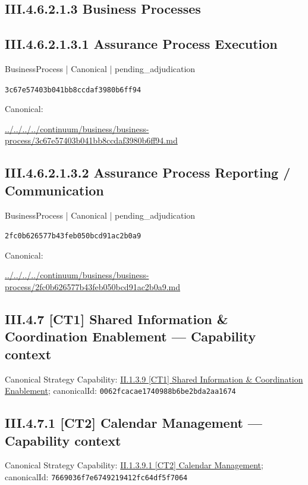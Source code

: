 \documentclass[10pt,a4paper]{article}
\begin{document}
\subsection*{III.4.6.2.1.3 Business Processes}
\subsection*{III.4.6.2.1.3.1 Assurance Process Execution}
\label{element-3c67e57403b041bb8ccdaf3980b6ff94}
{\small BusinessProcess | Canonical | pending\_adjudication}\par
\texttt{3c67e57403b041bb8ccdaf3980b6ff94}\par
Canonical: \par
{\footnotesize\url{../../../../continuum/business/business-process/3c67e57403b041bb8ccdaf3980b6ff94.md}}\par
\subsection*{III.4.6.2.1.3.2 Assurance Process Reporting / Communication}
\label{element-2fc0b626577b43feb050bcd91ac2b0a9}
{\small BusinessProcess | Canonical | pending\_adjudication}\par
\texttt{2fc0b626577b43feb050bcd91ac2b0a9}\par
Canonical: \par
{\footnotesize\url{../../../../continuum/business/business-process/2fc0b626577b43feb050bcd91ac2b0a9.md}}\par
\subsection*{III.4.7 [CT1] Shared Information \& Coordination Enablement — Capability context}
Canonical Strategy Capability: \hyperref[element-0062fcacae1740988b6be2bda2aa1674]{II.1.3.9 [CT1] Shared Information \& Coordination Enablement}; canonicalId: \texttt{0062fcacae1740988b6be2bda2aa1674}\par
\subsection*{III.4.7.1 [CT2] Calendar Management — Capability context}
Canonical Strategy Capability: \hyperref[element-7669036f7e6749219412fc64df5f7064]{II.1.3.9.1 [CT2] Calendar Management}; canonicalId: \texttt{7669036f7e6749219412fc64df5f7064}\par
\end{document}
